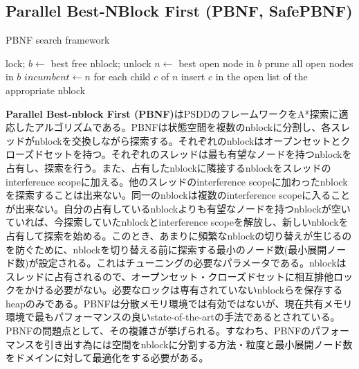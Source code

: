 \documentclass[uplatex]{jsarticle}
\begin{document}
\subsection{Parallel Best-NBlock First (PBNF, SafePBNF)}

\begin{algorithm}                      
\caption{PBNF search framework}         
\label{alg:pbnf}                          
\begin{algorithmic}                  
	\STATE lock; $b \leftarrow$ best free nblock; unlock
		\STATE $n \leftarrow$ best open node in $b$
			\STATE prune all open nodes in $b$
			\STATE $incumbent \leftarrow n$
		\ELSE 
			\STATE for each child $c$ of $n$
			\STATE insert $c$ in the open list of the appropriate nblock
		\ENDIF
\ENDWHILE
\ENDWHILE
\end{algorithmic}
\end{algorithm}

\textbf{Parallel Best-nblock First (PBNF)}はPSDDのフレームワークをA*探索に適応したアルゴリズムである\cite{Burns2010}。PBNFは状態空間を複数のnblockに分割し、各スレッドがnblockを交換しながら探索する。それぞれのnblockはオープンセットとクローズドセットを持つ。それぞれのスレッドは最も有望なノードを持つnblockを占有し、探索を行う。また、占有したnblockに隣接するnblockをスレッドのinterference scopeに加える。他のスレッドのinterference scopeに加わったnblockを探索することは出来ない。同一のnblockは複数のinterference scopeに入ることが出来ない。自分の占有しているnblockよりも有望なノードを持つnblockが空いていれば、今探索していたnblockとinterference scopeを解放し、新しいnblockを占有して探索を始める。このとき、あまりに頻繁なnblockの切り替えが生じるのを防ぐために、nblockを切り替える前に探索する最小のノード数(最小展開ノード数)が設定される。これはチューニングの必要なパラメータである。nblockはスレッドに占有されるので、オープンセット・クローズドセットに相互排他ロックをかける必要がない。必要なロックは専有されていないnblockらを保存するheapのみである。PBNFは分散メモリ環境では有効ではないが、現在共有メモリ環境で最もパフォーマンスの良いstate-of-the-artの手法であるとされている。PBNFの問題点として、その複雑さが挙げられる。すなわち、PBNFのパフォーマンスを引き出す為には空間をnblockに分割する方法・粒度と最小展開ノード数をドメインに対して最適化をする必要がある。
\end{document}
